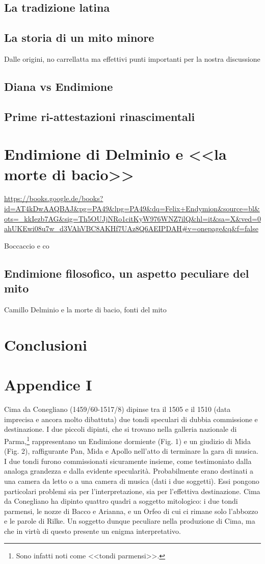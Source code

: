 \documentclass[12pt,a4paper,openright, oneside]{book}
\begin{document}
\section{La tradizione latina}
\section*{La storia di un mito minore}
Dalle origini, no carrellatta ma effettivi punti importanti per la nostra discussione
\section*{Diana vs Endimione}
\section*{Prime ri-attestazioni rinascimentali}
\chapter{Endimione di Delminio e <<la morte di bacio>>}
\url{https://books.google.de/books?id=AT4kDwAAQBAJ&pg=PA49&lpg=PA49&dq=Felix+Endymion&source=bl&ots=_kkIezb7AG&sig=Th5OUJjNRo1citKyW976WNZ7ilQ&hl=it&sa=X&ved=0ahUKEwi08u7w_d3VAhVBC8AKHf7UAz8Q6AEIPDAH#v=onepage&q&f=false}

Boccaccio e co
\section*{Endimione filosofico, un aspetto peculiare del mito}
Camillo Delminio e la morte di bacio, fonti del mito
\chapter*{Conclusioni}
\chapter*{Appendice I}
Cima da Conegliano (1459/60-1517/8) dipinse tra il 1505 e il 1510 (data imprecisa e ancora molto dibattuta) due tondi speculari di dubbia commissione e destinazione. I due piccoli dipinti, che si trovano nella galleria nazionale di Parma,\footnote{Sono infatti noti come <<tondi parmensi>>.} rappresentano un Endimione dormiente (Fig. 1) e un giudizio di Mida (Fig. 2), raffigurante Pan, Mida e Apollo nell'atto di terminare la gara di musica. I due tondi furono commissionati sicuramente insieme, come testimoniato dalla analoga grandezza e dalla evidente specularità. Probabilmente erano destinati a una camera da letto o a una camera di musica (dati i due soggetti). Essi pongono particolari problemi sia per l'interpretazione, sia per l'effettiva destinazione. 
Cima da Conegliano ha dipinto quattro quadri a soggetto mitologico: i due tondi parmensi, le nozze di Bacco e Arianna, e un Orfeo di cui ci rimane solo l'abbozzo e le parole di Rilke. Un soggetto dunque peculiare nella produzione di Cima, ma che in virtù di questo presente un enigma interpretativo.
\end{document}
